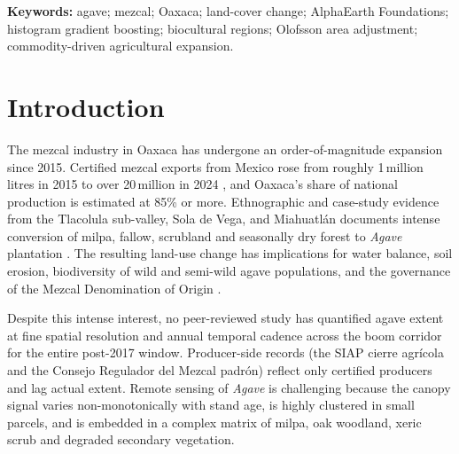 \documentclass[10pt,a4paper]{article}
\begin{document}
\begin{abstract}
\noindent\textbf{Conclusions.} Across the three core
mezcal-producing districts of Oaxaca (Tlacolula, Yautepec,
Miahuatlán; 69 municipios, $\sim$11{,}850~km$^2$), the post-2017
agave boom is a $\sim$4.4-fold expansion in raw map area, a net
gain of $\sim$14{,}400 ha. The expansion is concentrated in a
2024--2025 acceleration that more than triples 2017 extent in two
years and is the largest year-on-year change in the panel. This is
the first decadal, per-pixel, area-adjusted record of agave
cultivation restricted to the three administrative districts that
anchor the Oaxaca mezcal denomination of origin at 10\,m
resolution. The methodology is fully open-source and reproducible
on free public infrastructure.
\end{abstract}

\noindent\textbf{Keywords:} agave; mezcal; Oaxaca; land-cover change;
AlphaEarth Foundations; histogram gradient boosting; biocultural
regions; Olofsson area adjustment; commodity-driven agricultural
expansion.

\section{Introduction}\label{sec:intro}

The mezcal industry in Oaxaca has undergone an order-of-magnitude
expansion since 2015. Certified mezcal exports from Mexico rose from
roughly 1\,million litres in 2015 to over 20\,million in 2024
\citep{crt2024informe}, and Oaxaca's share of national production is
estimated at 85\% or more. Ethnographic and case-study evidence from the
Tlacolula sub-valley, Sola de Vega, and Miahuatl\'an documents intense
conversion of milpa, fallow, scrubland and seasonally dry forest to
\textit{Agave} plantation \citep{bowen2015divided,lira2022artisanal,
robson2022commons}. The resulting land-use change has implications for
water balance, soil erosion, biodiversity of wild and semi-wild agave
populations, and the governance of the Mezcal Denomination of Origin
\citep{torresgarcia2019agave,vargas2007tequila,rangel2017traditional}.

Despite this intense interest, no peer-reviewed study has quantified
agave extent at fine spatial resolution and annual temporal cadence
across the boom corridor for the entire post-2017 window. Producer-side
records (the SIAP cierre agr\'icola and the Consejo Regulador del Mezcal
padr\'on) reflect only certified producers and lag actual extent.
Remote sensing of \textit{Agave} is challenging because the canopy
signal varies non-monotonically with stand age, is highly clustered in
small parcels, and is embedded in a complex matrix of milpa, oak woodland,
xeric scrub and degraded secondary vegetation.
\end{document}
